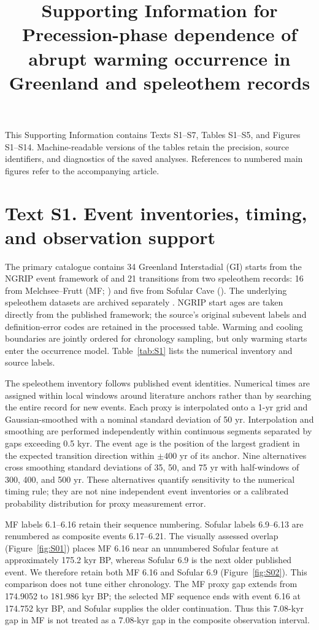 \documentclass[11pt]{article}
\title{Supporting Information for\\Precession-phase dependence of abrupt warming occurrence in Greenland and speleothem records}
\author{}
\date{}
\begin{document}
\maketitle
\noindent This Supporting Information contains Texts S1--S7, Tables S1--S5, and Figures S1--S14. Machine-readable versions of the tables retain the precision, source identifiers, and diagnostics of the saved analyses. References to numbered main figures refer to the accompanying article.

\section*{Text S1. Event inventories, timing, and observation support}

The primary catalogue contains 34 Greenland Interstadial (GI) starts from the NGRIP event framework of \citet{rasmussen2014stratigraphic} and 21 transitions from two speleothem records: 16 from Melchsee--Frutt (MF; \citealp{fohlmeister2023role}) and five from Sofular Cave (\citealp{held2024dansgaard}). The underlying speleothem datasets are archived separately \citep{fohlmeister2023mfData,held2024sofularData}. NGRIP start ages are taken directly from the published framework; the source's original subevent labels and definition-error codes are retained in the processed table. Warming and cooling boundaries are jointly ordered for chronology sampling, but only warming starts enter the occurrence model. Table~\ref{tab:S1} lists the numerical inventory and source labels.

The speleothem inventory follows published event identities. Numerical times are assigned within local windows around literature anchors rather than by searching the entire record for new events. Each proxy is interpolated onto a 1-yr grid and Gaussian-smoothed with a nominal standard deviation of 50 yr. Interpolation and smoothing are performed independently within continuous segments separated by gaps exceeding 0.5 kyr. The event age is the position of the largest gradient in the expected transition direction within $\pm400$ yr of its anchor. Nine alternatives cross smoothing standard deviations of 35, 50, and 75 yr with half-windows of 300, 400, and 500 yr. These alternatives quantify sensitivity to the numerical timing rule; they are not nine independent event inventories or a calibrated probability distribution for proxy measurement error.

MF labels 6.1--6.16 retain their sequence numbering. Sofular labels 6.9--6.13 are renumbered as composite events 6.17--6.21. The visually assessed overlap (Figure~\ref{fig:S01}) places MF 6.16 near an unnumbered Sofular feature at approximately 175.2 kyr BP, whereas Sofular 6.9 is the next older published event. We therefore retain both MF 6.16 and Sofular 6.9 (Figure~\ref{fig:S02}). This comparison does not tune either chronology. The MF proxy gap extends from 174.9052 to 181.986 kyr BP; the selected MF sequence ends with event 6.16 at 174.752 kyr BP, and Sofular supplies the older continuation. Thus this 7.08-kyr gap in MF is not treated as a 7.08-kyr gap in the composite observation interval.
\end{document}
